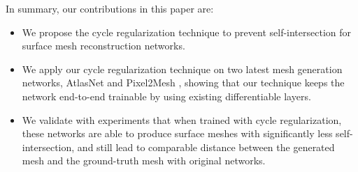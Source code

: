 In summary, our contributions in this paper are:
\begin{itemize}
	\item We propose the cycle regularization technique to prevent self-intersection for surface mesh reconstruction networks. 
	\item We apply our cycle regularization technique on two latest mesh generation networks, AtlasNet \cite{atlasnet} and Pixel2Mesh \cite{pixel2mesh}, showing that our technique keeps the network end-to-end trainable by using existing differentiable layers.
	\item We validate with experiments that when trained with cycle regularization, these networks are able to produce surface meshes with significantly less self-intersection, and still lead to comparable distance between the generated mesh and the ground-truth mesh with original networks. 
\end{itemize}

 
